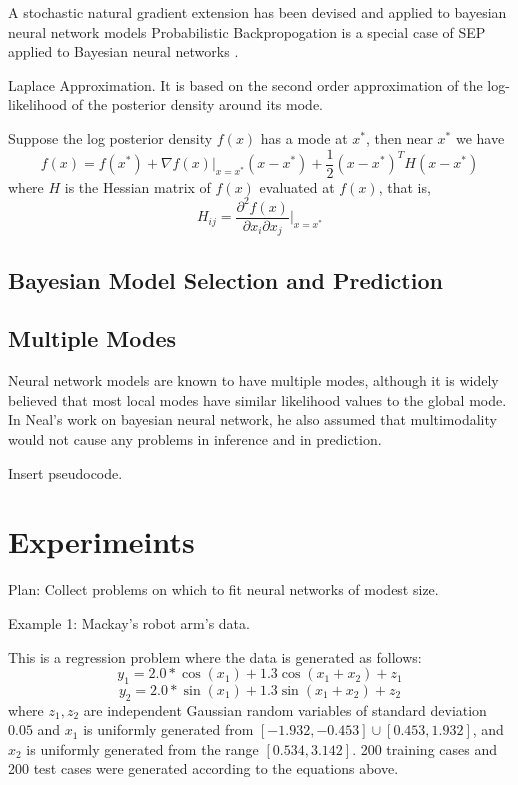 \documentclass[12pt]{report}
\begin{document}
\begin{enumerate}
A stochastic natural gradient extension has been devised and applied to bayesian neural network models \cite{teh2015distributed}
Probabilistic Backpropogation is a special case of SEP applied to Bayesian neural networks \cite{hernandez2015probabilistic}.


Laplace Approximation. It is based on the second order approximation of the
log-likelihood of the posterior density around its mode.

Suppose the log posterior density $f(x)$ has a mode at $x^*$, then near $x^*$ we
have 
\[ f(x) = f(x^*) + \nabla f(x)|_{x=x^*} (x-x^*) + \frac{1}{2} (x-x^*)^TH(x-x^*)
\]
where $H$ is the Hessian matrix of $f(x)$ evaluated at $f(x)$, that is,
\[ H_{ij} = \frac{\partial^2 f(x)}{\partial x_i \partial x_j }|_{x=x^*} \]




\section{Bayesian Model Selection and Prediction}


\section{Multiple Modes}

Neural network models are known to have multiple modes, although it is widely believed that most local modes have similar likelihood values to the global mode. In Neal's work on bayesian neural network, he also assumed that multimodality would not cause any problems in inference and in prediction. 


Insert pseudocode. 
\chapter{Experimeints}
Plan:
Collect problems on which to fit neural networks of modest size. 

Example 1: Mackay's robot arm's data. 

This is a regression problem where the data is generated as follows:
\[ y_1 = 2.0 * \cos(x_1) + 1.3 \cos(x_1+x_2) + z_1 \]
\[ y_2 = 2.0 * \sin(x_1) + 1.3 \sin(x_1+x_2) + z_2 \]
where $z_1,z_2$ are independent Gaussian random variables of standard deviation
$0.05$ and $x_1$ is uniformly generated from $[-1.932,-0.453]\cup
[0.453,1.932]$, and $x_2$ is uniformly generated from the range $[0.534,3.142]$.
200 training cases and 200 test cases were generated according to the equations
above. 


\end{enumerate}
\end{document}
